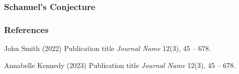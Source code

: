 \documentclass{beamer}
\begin{document}
\begin{frame}
    \frametitle{Schanuel's Conjecture}
    \begin{theorem}
        
    \end{theorem}
\end{frame}




\begin{frame} %
	\frametitle{References}
	
	\begin{thebibliography}{99} %
		\footnotesize %
		
			John Smith (2022)
			\newblock Publication title
			\newblock \emph{Journal Name} 12(3), 45 -- 678.
			
			Annabelle Kennedy (2023)
			\newblock Publication title
			\newblock \emph{Journal Name} 12(3), 45 -- 678.
	\end{thebibliography}
\end{frame}




\end{document}
